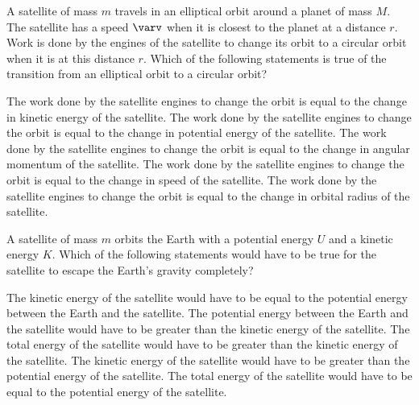 \documentclass{../../../oss-classkick-exam}
\begin{document}
\begin{multicols*}{2}
\begin{questions}
    \question A satellite of mass $m$ travels in an elliptical orbit around a
    planet of mass $M$. The satellite has a speed $\varv$ when it is closest to
    the planet at a distance $r$. Work is done by the engines of the satellite
    to change its orbit to a circular orbit when it is at this distance $r$.
    Which of the following statements is true of the transition from an
    elliptical orbit to a circular orbit?
    \begin{choices}
      \choice The work done by the satellite engines to change the orbit is
      equal to the change in kinetic energy of the satellite.
      \choice The work done by the satellite engines to change the orbit is
      equal to the change in potential energy of the satellite.
      \choice The work done by the satellite engines to change the orbit is
      equal to the change in angular momentum of the satellite.
      \choice The work done by the satellite engines to change the orbit is
      equal to the change in speed of the satellite.
      \choice The work done by the satellite engines to change the orbit is
      equal to the change in orbital radius of the satellite.
    \end{choices}
    \vspace{.7in}
    
    \question A satellite of mass $m$ orbits the Earth with a potential energy
    $U$ and a kinetic energy $K$. Which of the following statements would have
    to be true for the satellite to escape the Earth's gravity completely?
    \begin{choices}
      \choice The kinetic energy of the satellite would have to be equal to the
      potential energy between the Earth and the satellite.
      \choice The potential energy between the Earth and the satellite would
      have to be greater than the kinetic energy of the satellite.
      \choice The total energy of the satellite would have to be greater than
      the kinetic energy of the satellite.
      \choice The kinetic energy of the satellite would have to be greater than
      the potential energy of the satellite.
      \choice The total energy of the satellite would have to be equal to the
      potential energy of the satellite.
    \end{choices}
  \end{questions}
\end{multicols*}
\newpage


\genfreedirections
\end{document}
